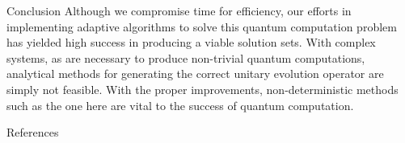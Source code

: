 \documentclass[12pt]{beamer}
\begin{document}
\begin{frame}
\begin{columns}
\begin{column}{.45\textwidth}
\begin{exampleblock}{Conclusion}
Although we compromise time for efficiency, our efforts in implementing adaptive algorithms to solve this quantum computation problem has yielded high success in producing a viable solution sets. With complex systems, as are necessary to produce non-trivial quantum computations, analytical methods for generating the correct unitary evolution operator are simply not feasible. With the proper improvements, non-deterministic methods such as the one here are vital to the success of quantum computation. 

					
				\end{exampleblock}
				\vspace{1em}
				
				\begin{block}{References}

					
						
				\end{block}
			\end{column}	
		\end{columns}
	\end{frame}	
\centering
\end{document}
